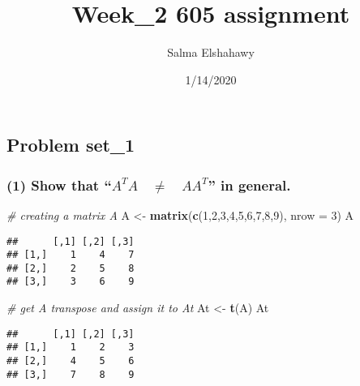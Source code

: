 \documentclass[]{article}
\title{Week\_2 605 assignment}
\author{Salma Elshahawy}
\date{1/14/2020}
\newenvironment{Shaded}{\begin{snugshade}}{\end{snugshade}}
\newcommand{\CommentTok}[1]{\textcolor[rgb]{0.56,0.35,0.01}{\textit{#1}}}
\newcommand{\DataTypeTok}[1]{\textcolor[rgb]{0.13,0.29,0.53}{#1}}
\newcommand{\DecValTok}[1]{\textcolor[rgb]{0.00,0.00,0.81}{#1}}
\newcommand{\KeywordTok}[1]{\textcolor[rgb]{0.13,0.29,0.53}{\textbf{#1}}}
\newcommand{\NormalTok}[1]{#1}
\newcommand{\StringTok}[1]{\textcolor[rgb]{0.31,0.60,0.02}{#1}}
\begin{document}
\maketitle

\hypertarget{problem-set_1}{%
\subsection{Problem set\_1}\label{problem-set_1}}

\hypertarget{show-that-a-t-aquad-neq-quad-a-a-t-in-general.}{%
\subsubsection{\texorpdfstring{(1) Show that
``\({ A }^{ T }A\quad \neq \quad A{ A }^{ T }\)'' in
general.}{(1) Show that ``\{ A \}\^{}\{ T \}A\textbackslash quad \textbackslash neq \textbackslash quad A\{ A \}\^{}\{ T \}'' in general.}}\label{show-that-a-t-aquad-neq-quad-a-a-t-in-general.}}

\begin{Shaded}
\begin{Highlighting}[]
\CommentTok{# creating a matrix A}
\NormalTok{A <-}\StringTok{ }\KeywordTok{matrix}\NormalTok{(}\KeywordTok{c}\NormalTok{(}\DecValTok{1}\NormalTok{,}\DecValTok{2}\NormalTok{,}\DecValTok{3}\NormalTok{,}\DecValTok{4}\NormalTok{,}\DecValTok{5}\NormalTok{,}\DecValTok{6}\NormalTok{,}\DecValTok{7}\NormalTok{,}\DecValTok{8}\NormalTok{,}\DecValTok{9}\NormalTok{), }\DataTypeTok{nrow =} \DecValTok{3}\NormalTok{)}
\NormalTok{A}
\end{Highlighting}
\end{Shaded}

\begin{verbatim}
##      [,1] [,2] [,3]
## [1,]    1    4    7
## [2,]    2    5    8
## [3,]    3    6    9
\end{verbatim}

\begin{Shaded}
\begin{Highlighting}[]
\CommentTok{# get A transpose and assign it to At}
\NormalTok{At <-}\StringTok{ }\KeywordTok{t}\NormalTok{(A)}
\NormalTok{At}
\end{Highlighting}
\end{Shaded}

\begin{verbatim}
##      [,1] [,2] [,3]
## [1,]    1    2    3
## [2,]    4    5    6
## [3,]    7    8    9
\end{verbatim}
\end{document}
